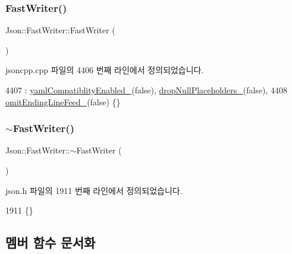 \subsubsection{\texorpdfstring{Fast\+Writer()}{FastWriter()}}
{\footnotesize\ttfamily Json\+::\+Fast\+Writer\+::\+Fast\+Writer (\begin{DoxyParamCaption}{ }\end{DoxyParamCaption})}



jsoncpp.\+cpp 파일의 4406 번째 라인에서 정의되었습니다.


\begin{DoxyCode}
4407     : \hyperlink{class_json_1_1_fast_writer_a4c4c1911179bf472d24492915b0e489a}{yamlCompatiblityEnabled\_}(\textcolor{keyword}{false}), 
      \hyperlink{class_json_1_1_fast_writer_a97e9d4ff84b59a48756dcc27a71b5904}{dropNullPlaceholders\_}(\textcolor{keyword}{false}),
4408       \hyperlink{class_json_1_1_fast_writer_abd6e13851db6dcf59d84af68d48d50ac}{omitEndingLineFeed\_}(\textcolor{keyword}{false}) \{\}
\end{DoxyCode}
\mbox{\label{class_json_1_1_fast_writer_a34152eac509fe00c9b2e15ce2fc94ab8}} 
\subsubsection{\texorpdfstring{$\sim$\+Fast\+Writer()}{~FastWriter()}}
{\footnotesize\ttfamily Json\+::\+Fast\+Writer\+::$\sim$\+Fast\+Writer (\begin{DoxyParamCaption}{ }\end{DoxyParamCaption})\hspace{0.3cm}{\ttfamily [inline]}}



json.\+h 파일의 1911 번째 라인에서 정의되었습니다.


\begin{DoxyCode}
1911 \{\}
\end{DoxyCode}


\subsection{멤버 함수 문서화}
\mbox{\label{class_json_1_1_fast_writer_a6e93d8dce951e408517311026a065b40}} 
